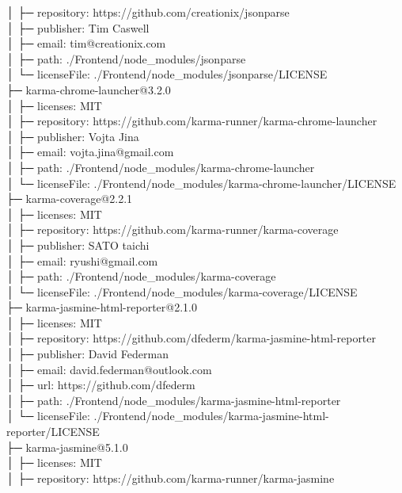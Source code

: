 \documentclass[
    paper=a4,
    twoside=false,
    parskip=half,
    listof=entryprefix,
    listof=totoc,
    index=totoc,
    bibliography=totoc,
    headsepline,
]{scrbook}
\begin{document}
    │  ├─ repository: https://github.com/creationix/jsonparse\\
    │  ├─ publisher: Tim Caswell\\
    │  ├─ email: tim@creationix.com\\
    │  ├─ path: ./Frontend/node\_modules/jsonparse\\
    │  └─ licenseFile: ./Frontend/node\_modules/jsonparse/LICENSE\\
    ├─ karma-chrome-launcher@3.2.0\\
    │  ├─ licenses: MIT\\
    │  ├─ repository: https://github.com/karma-runner/karma-chrome-launcher\\
    │  ├─ publisher: Vojta Jina\\
    │  ├─ email: vojta.jina@gmail.com\\
    │  ├─ path: ./Frontend/node\_modules/karma-chrome-launcher\\
    │  └─ licenseFile: ./Frontend/node\_modules/karma-chrome-launcher/LICENSE\\
    ├─ karma-coverage@2.2.1\\
    │  ├─ licenses: MIT\\
    │  ├─ repository: https://github.com/karma-runner/karma-coverage\\
    │  ├─ publisher: SATO taichi\\
    │  ├─ email: ryushi@gmail.com\\
    │  ├─ path: ./Frontend/node\_modules/karma-coverage\\
    │  └─ licenseFile: ./Frontend/node\_modules/karma-coverage/LICENSE\\
    ├─ karma-jasmine-html-reporter@2.1.0\\
    │  ├─ licenses: MIT\\
    │  ├─ repository: https://github.com/dfederm/karma-jasmine-html-reporter\\
    │  ├─ publisher: David Federman\\
    │  ├─ email: david.federman@outlook.com\\
    │  ├─ url: https://github.com/dfederm\\
    │  ├─ path: ./Frontend/node\_modules/karma-jasmine-html-reporter\\
    │  └─ licenseFile: ./Frontend/node\_modules/karma-jasmine-html-reporter/LICENSE\\
    ├─ karma-jasmine@5.1.0\\
    │  ├─ licenses: MIT\\
    │  ├─ repository: https://github.com/karma-runner/karma-jasmine\\
\end{document}

